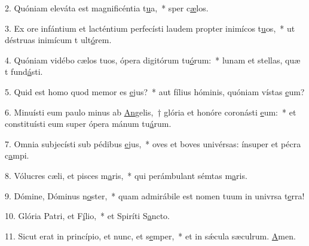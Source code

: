 2. Quóniam eleváta est magnificéntia t\uline{u}a,~* sper c\uline{æ}los.\par 
3. Ex ore infántium et lacténtium perfecísti laudem propter inimícos t\uline{u}os,~* ut déstruas inimícum t ult\uline{ó}rem.\par 
4. Quóniam vidébo cælos tuos, ópera digitórum tu\uline{ó}rum:~* lunam et stellas, quæ t fund\uline{á}sti.\par 
5. Quid est homo quod memor es \uline{e}jus?~* aut fílius hóminis, quóniam vístas \uline{e}um?\par 
6. Minuísti eum paulo minus ab \uline{An}gelis,~† glória et honóre coronásti \uline{e}um:~* et constituísti eum super ópera mánum tu\uline{á}rum.\par 
7. Omnia subjecísti sub pédibus \uline{e}jus,~* oves et boves univérsas: ínsuper et pécra c\uline{a}mpi.\par 
8. Vólucres cæli, et pisces m\uline{a}ris,~* qui perámbulant sémtas m\uline{a}ris.\par 
9. Dómine, Dóminus n\uline{o}ster,~* quam admirábile est nomen tuum in univrsa t\uline{e}rra!\par 
10. Glória Patri, et F\uline{í}lio,~* et Spiríti S\uline{a}ncto.\par 
11. Sicut erat in princípio, et nunc, et s\uline{e}mper,~* et in sǽcula sæculrum. \uline{A}men.\par 
